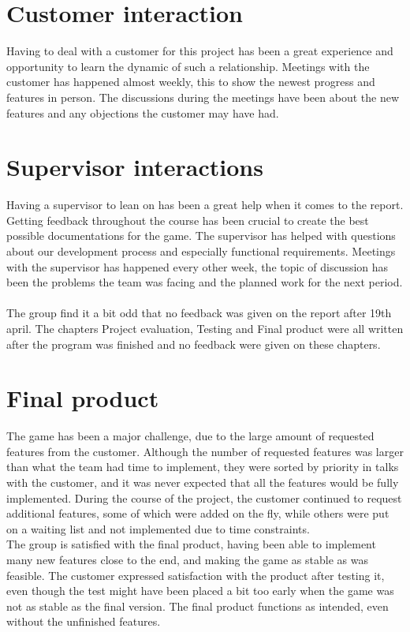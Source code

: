 \section{Customer interaction}

Having to deal with a customer for this project has been a great experience and opportunity to learn the dynamic of such a relationship. Meetings with the customer has happened almost weekly, this to show the newest progress and features in person. The discussions during the meetings have been about the new features and any objections the customer may have had. 

\section{Supervisor interactions}
Having a supervisor to lean on has been a great help when it comes to the report. Getting feedback throughout the course has been crucial to create the best possible documentations for the game. The supervisor has helped with questions about our development process and especially functional requirements. Meetings with the supervisor has happened every other week, the topic of discussion has been the problems the team was facing and the planned work for the next period. \\
\\
The group find it a bit odd that no feedback was given on the report after 19th april. The chapters Project evaluation, Testing and Final product were all written after the program was finished and no feedback were given on these chapters.

\section{Final product}

The game has been a major challenge, due to the large amount of requested features from the customer. Although the number of requested features was larger than what the team had time to implement, they were sorted by priority in talks with the customer, and it was never expected that all the features would be fully implemented. During the course of the project, the customer continued to request additional features, some of which were added on the fly, while others were put on a waiting list and not implemented due to time constraints.\\
\newline
The group is satisfied with the final product, having been able to implement many new features close to the end, and making the game as stable as was feasible. The customer expressed satisfaction with the product after testing it, even though the test might have been placed a bit too early when the game was not as stable as the final version. The final product functions as intended, even without the unfinished features.\\

